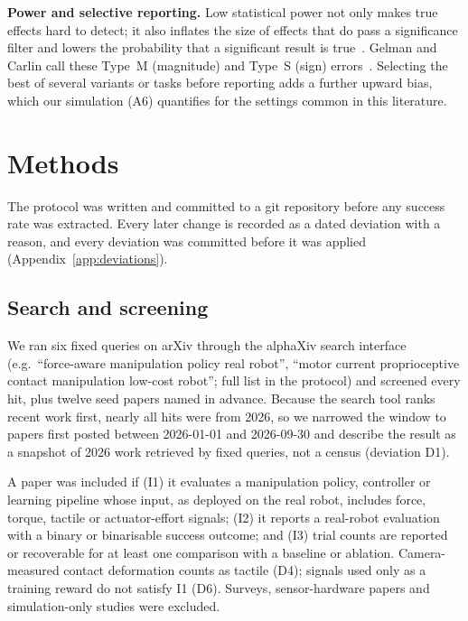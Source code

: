 \documentclass[11pt]{article}
\begin{document}
\textbf{Power and selective reporting.} Low statistical power not only makes true effects hard to detect; it also inflates the size of effects that do pass a significance filter and lowers the probability that a significant result is true~\cite{button2013,ioannidis2005}. Gelman and Carlin call these Type~M (magnitude) and Type~S (sign) errors~\cite{gelman2014}. Selecting the best of several variants or tasks before reporting adds a further upward bias, which our simulation (A6) quantifies for the settings common in this literature.

\section{Methods}\label{sec:methods}
The protocol was written and committed to a git repository before any success rate was extracted. Every later change is recorded as a dated deviation with a reason, and every deviation was committed before it was applied (Appendix~\ref{app:deviations}).

\subsection{Search and screening}
We ran six fixed queries on arXiv through the alphaXiv search interface (e.g.\ ``force-aware manipulation policy real robot'', ``motor current proprioceptive contact manipulation low-cost robot''; full list in the protocol) and screened every hit, plus twelve seed papers named in advance. Because the search tool ranks recent work first, nearly all hits were from 2026, so we narrowed the window to papers first posted between 2026-01-01 and 2026-09-30 and describe the result as a snapshot of 2026 work retrieved by fixed queries, not a census (deviation D1).

A paper was included if (I1) it evaluates a manipulation policy, controller or learning pipeline whose input, as deployed on the real robot, includes force, torque, tactile or actuator-effort signals; (I2) it reports a real-robot evaluation with a binary or binarisable success outcome; and (I3) trial counts are reported or recoverable for at least one comparison with a baseline or ablation. Camera-measured contact deformation counts as tactile (D4); signals used only as a training reward do not satisfy I1 (D6). Surveys, sensor-hardware papers and simulation-only studies were excluded.
\end{document}
